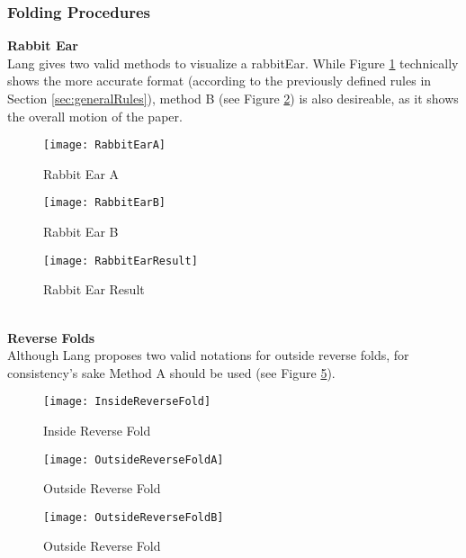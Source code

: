\newpage
\subsubsection{Folding Procedures}
\textbf{Rabbit Ear}\\
Lang gives two valid methods to visualize a \gls{rabbitEar}. While Figure \ref{fig:rabbitEarA} technically shows the more accurate format (according to the previously defined rules in Section \ref{sec:generalRules}), method B (see Figure \ref{fig:rabbitEarB}) is also desireable, as it shows the overall motion of the paper.
\begin{figure*}[h]
    \centering
    \begin{subfigure}[b]{0.27\textwidth}
        \texttt{[image: RabbitEarA]}
        \caption{Rabbit Ear A}
        \label{fig:rabbitEarA}
    \end{subfigure}
    \begin{subfigure}[b]{0.35\textwidth}
        \texttt{[image: RabbitEarB]}
        \caption{Rabbit Ear B}
        \label{fig:rabbitEarB}
    \end{subfigure}
    \begin{subfigure}[b]{0.33\textwidth}
	\texttt{[image: RabbitEarResult]}
	\caption{Rabbit Ear Result}
	\label{fig:rabbitEarResult}
    \end{subfigure}
    \caption{Both methods show a rabbit ear fold}
    \label{fig:rabbitEarMethods}
\end{figure*}
\\
\textbf{Reverse Folds}\\
Although Lang proposes two valid notations for outside reverse folds, for consistency's sake Method A should be used (see Figure \ref{fig:outsideReverseFoldA}).
\begin{figure*}[h]
	\centering
	\begin{subfigure}[b]{0.3\textwidth}
		\texttt{[image: InsideReverseFold]}
		\caption{Inside Reverse Fold}
		\label{fig:insideReverseFold}
	\end{subfigure}
	\begin{subfigure}[b]{0.3\textwidth}
		\texttt{[image: OutsideReverseFoldA]}
		\caption{Outside Reverse Fold}
		\label{fig:outsideReverseFoldA}
	\end{subfigure}
	\begin{subfigure}[b]{0.3\textwidth}
		\texttt{[image: OutsideReverseFoldB]}
		\caption{Outside Reverse Fold}
		\label{fig:outsideReverseFoldB}
	\end{subfigure}
	\caption{Different reverse folds}
	\label{fig:reverseFoldMethods}
\end{figure*}

